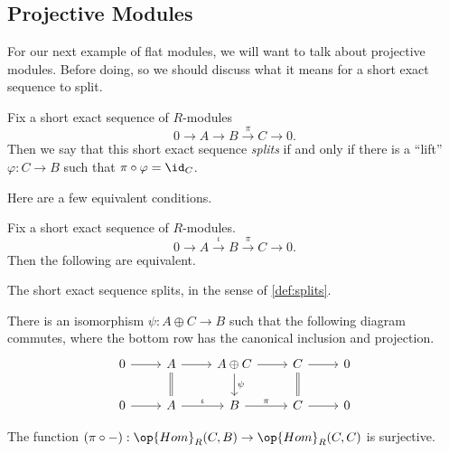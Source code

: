 \subsection{Projective Modules}
For our next example of flat modules, we will want to talk about projective modules. Before doing, so we should discuss what it means for a short exact sequence to split.
\begin{definition}[Splits] \label{def:splits}
	Fix a short exact sequence of $R$-modules
	\[0\to A\to B\stackrel\pi\to C\to0.\]
	Then we say that this short exact sequence \textit{splits} if and only if there is a ``lift'' $\varphi:C\to B$ such that $\pi\circ\varphi=\id_C$.
\end{definition}
Here are a few equivalent conditions.
\begin{lemma} \label{lem:splitgrabbag}
	Fix a short exact sequence of $R$-modules.
	\[0\to A\stackrel\iota\to B\stackrel\pi\to C\to0.\]
	Then the following are equivalent.
	\begin{listalph}
		\item The short exact sequence splits, in the sense of \autoref{def:splits}.
		\item There is an isomorphism $\psi:A\oplus C\to B$ such that the following diagram commutes, where the bottom row has the canonical inclusion and projection.
		\[\begin{tikzcd}
			0 & A & {A\oplus C} & C & 0 \\
			0 & A & B & C & 0
			\arrow[from=1-1, to=1-2]
			\arrow[from=1-2, to=1-3]
			\arrow[from=1-3, to=1-4]
			\arrow[from=1-4, to=1-5]
			\arrow[from=2-1, to=2-2]
			\arrow["\iota", from=2-2, to=2-3]
			\arrow["\pi", from=2-3, to=2-4]
			\arrow[from=2-4, to=2-5]
			\arrow[Rightarrow, no head, from=1-2, to=2-2]
			\arrow["\psi", from=1-3, to=2-3]
			\arrow[Rightarrow, no head, from=1-4, to=2-4]
		\end{tikzcd}\]
		\item The function $(\pi\circ-):\op{Hom}_R(C,B)\to\op{Hom}_R(C,C)$ is surjective.
	\end{listalph}
\end{lemma}

